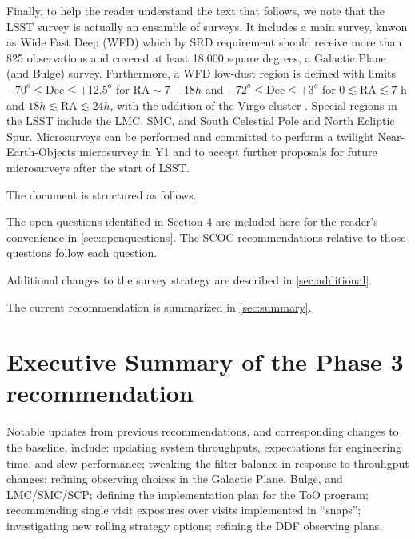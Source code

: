 Finally, to help the reader understand the text that follows, we note that the LSST survey is actually an ensamble of surveys. It includes a main survey, knwon as Wide Fast Deep (WFD) which by SRD requirement should receive more than 825 observations and covered at least 18,000 square degrees, a Galactic Plane (and Bulge) survey. Furthermore, a WFD low-dust region is defined with limits $-70^o \leq \mathrm{Dec} \leq +12.5^o$ for 
$\mathrm{RA} \sim   7-18 h$ and $-72^o \leq \mathrm{Dec}\leq +3^o$
for $0 \lesssim \mathrm{RA} \lesssim 7$ h and $18 h \lesssim \mathrm{RA} \lesssim 24 h$, with the addition of the Virgo cluster .  Special regions in the LSST include the LMC, SMC, and South Celestial Pole and North Ecliptic Spur. Microsurveys can be performed and  committed to perform a twilight Near-Earth-Objects microsurvey in Y1 and to accept further proposals for future microsurveys after the start of LSST.

The document is structured as follows.



The open questions identified in  Section 4  are included here for the reader's convenience in \autoref{sec:openquestions}. The SCOC recommendations relative to those questions follow each question. 

Additional changes to the survey strategy are described in \autoref{sec:additional}. 

The current recommendation is summarized in \autoref{sec:summary}.


\section{Executive Summary of the Phase 3 recommendation}

Notable updates from previous recommendations, and corresponding changes to the baseline, include: updating system throughputs,  expectations for engineering time, and slew performance; tweaking the filter balance in response to throuhgput changes; refining observing choices in the Galactic Plane, Bulge, and LMC/SMC/SCP; defining the implementation plan for the ToO program; recommending single visit exposures over visits implemented in ``snaps''; investigating new rolling strategy options; refining the DDF observing plans.

